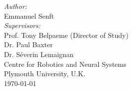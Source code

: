 %
%
\newcommand{\HRule}[1]{\rule{\linewidth}{#1}} 	%

\makeatletter							%
\def\printtitle{%
    {\centering \@title\par}}
\makeatother									

\makeatletter							%
\def\printauthor{%
    {\centering \large \@author}}				
\makeatother							




\begin{titlepage}
\thispagestyle{empty}				%

\printtitle									%
  	\vfill


\large

\begin{center}
	\emph{Author:}\\
	Emmanuel Senft \\
[1.cm]	
	\emph{Supervisors:}\\
	Prof. Tony Belpaeme (Director of Study)\\
	Dr. Paul Baxter\\
	Dr. S\'{e}verin Lemaignan\\
[1.5cm]

	Centre for Robotics and Neural Systems\\
	Plymouth University, U.K.\\
[1.5cm]
\normalsize 
	\today
\end{center}

\end{titlepage}